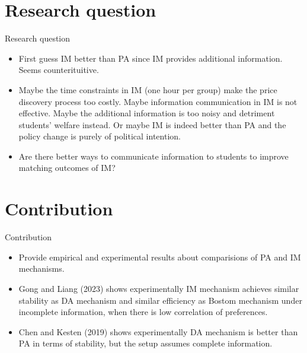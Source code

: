 \documentclass[dvipsnames,mathserif]{beamer}
\begin{document}
{\section{Research question}
\begin{frame}{Research question}
    \begin{itemize}
    	\item First guess IM better than PA since IM provides additional information. Seems counterituitive.\\
    	\item Maybe the time constraints in IM (one hour per group) make the price discovery process too costly. Maybe information communication in IM is not effective. Maybe the additional information is too noisy and detriment students' welfare instead. Or maybe IM is indeed better than PA and the policy change is purely of political intention. 
        \item Are there better ways to communicate information to students to improve matching outcomes of IM? \\
    \end{itemize}
\end{frame}

\section{Contribution}
\begin{frame}{Contribution}
    \begin{itemize}
        \item Provide empirical and experimental results about comparisions of PA and IM mechanisms. \\
        \item Gong and Liang (2023) shows experimentally IM mechanism achieves similar stability as DA mechanism and similar efficiency as Bostom mechanism under incomplete information, when there is low correlation of preferences.\\
        \item Chen and Kesten (2019) shows experimentally DA mechanism is better than PA in terms of stability, but the setup assumes complete information.   
    \end{itemize}
\end{frame}


}
\end{document}
